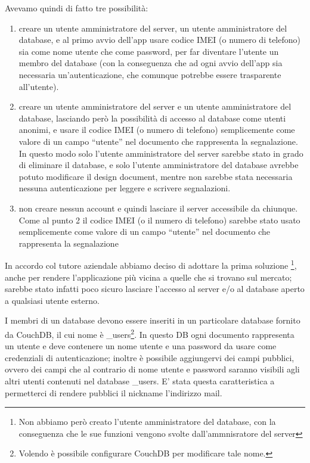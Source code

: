 		Avevamo quindi di fatto tre possibilità:
		\begin{enumerate} 
			\item creare un utente amministratore del server, un utente amministratore 
				del database, e al primo avvio dell'app usare codice IMEI (o numero di telefono) 
				sia come nome utente che come password, per far diventare l'utente un 
				membro del database (con la conseguenza che ad ogni avvio dell'app 
				sia necessaria un'autenticazione, che comunque potrebbe essere 
				trasparente all'utente).
			\item creare un utente amministratore del server e un utente amministratore 
				del database, lasciando però la possibilità di accesso al database 
				come utenti anonimi, e usare il codice IMEI (o numero di telefono) 
				semplicemente come valore di un campo ``utente'' nel documento che 
				rappresenta la segnalazione. In questo modo solo l'utente amministratore 
				del server sarebbe stato in grado di eliminare il database, e solo 
				l'utente amministratore del database avrebbe potuto modificare il 
				design document, mentre non sarebbe stata necessaria nessuna 
				autenticazione per leggere e scrivere segnalazioni.
			\item non creare nessun account e quindi lasciare il server accessibile 
				da chiunque. Come al punto 2 il codice IMEI (o il numero di telefono) 
				sarebbe stato usato semplicemente come valore di un campo ``utente''
				nel documento che rappresenta la segnalazione
		\end{enumerate}
		In accordo col tutore aziendale abbiamo deciso di adottare la prima soluzione
		\footnote{Non abbiamo però creato l'utente amministratore del database, con 
		la conseguenza che le sue funzioni vengono svolte dall'ammnisratore del server}, 
		anche per rendere l'applicazione più vicina a quelle che si trovano sul 
		mercato; sarebbe stato infatti poco sicuro lasciare l'accesso al server 
		e/o al database aperto a qualsiasi utente esterno.
		
		I membri di un database devono essere inseriti in un particolare database 
		fornito da CouchDB, il cui nome è \_users\footnote{Volendo è possibile 
		configurare CouchDB per modificare tale nome.}. In questo DB ogni documento 
		rappresenta un utente e deve contenere un nome utente e una password da 
		usare come credenziali di autenticazione; inoltre è possibile aggiungervi 
		dei campi pubblici, ovvero dei campi che al contrario di nome utente e 
		password saranno visibili agli altri utenti contenuti nel database \_users.
		E' stata questa caratteristica a permetterci di rendere pubblici il nickname 
		l'indirizzo mail.
		

